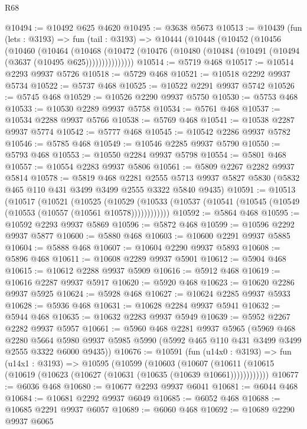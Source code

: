 \begin{lexlean}{R68}
\begin{coremodule}
@10494 := @10492 @625 @4620
@10495 := @3638 @5673
@10513 := @10439
    (fun (lets : @3193) =>
    fun (tail : @3193) =>
    @10444
      (@10448
        (@10452
          (@10456
            (@10460
              (@10464
                (@10468
                  (@10472 (@10476 (@10480 (@10484 (@10491 (@10494 (@3637 (@10495 @625)))))))))))))))
@10514 := @5719 @468
@10517 := @10514 @2293 @9937 @5726
@10518 := @5729 @468
@10521 := @10518 @2292 @9937 @5734
@10522 := @5737 @468
@10525 := @10522 @2291 @9937 @5742
@10526 := @5745 @468
@10529 := @10526 @2290 @9937 @5750
@10530 := @5753 @468
@10533 := @10530 @2289 @9937 @5758
@10534 := @5761 @468
@10537 := @10534 @2288 @9937 @5766
@10538 := @5769 @468
@10541 := @10538 @2287 @9937 @5774
@10542 := @5777 @468
@10545 := @10542 @2286 @9937 @5782
@10546 := @5785 @468
@10549 := @10546 @2285 @9937 @5790
@10550 := @5793 @468
@10553 := @10550 @2284 @9937 @5798
@10554 := @5801 @468
@10557 := @10554 @2283 @9937 @5806
@10561 := @5809 @2267 @2282 @9937 @5814
@10578 := @5819
    @468
    @2281
    @2555
    @5713
    @9937
    @5827
    @5830
    (@5832 @465 @110 @431 @3499 @3499 @2555 @3322 @5840 @9435)
@10591 := @10513
    (@10517
      (@10521
        (@10525
          (@10529 (@10533 (@10537 (@10541 (@10545 (@10549 (@10553 (@10557 (@10561 @10578))))))))))))
@10592 := @5864 @468
@10595 := @10592 @2293 @9937 @5869
@10596 := @5872 @468
@10599 := @10596 @2292 @9937 @5877
@10600 := @5880 @468
@10603 := @10600 @2291 @9937 @5885
@10604 := @5888 @468
@10607 := @10604 @2290 @9937 @5893
@10608 := @5896 @468
@10611 := @10608 @2289 @9937 @5901
@10612 := @5904 @468
@10615 := @10612 @2288 @9937 @5909
@10616 := @5912 @468
@10619 := @10616 @2287 @9937 @5917
@10620 := @5920 @468
@10623 := @10620 @2286 @9937 @5925
@10624 := @5928 @468
@10627 := @10624 @2285 @9937 @5933
@10628 := @5936 @468
@10631 := @10628 @2284 @9937 @5941
@10632 := @5944 @468
@10635 := @10632 @2283 @9937 @5949
@10639 := @5952 @2267 @2282 @9937 @5957
@10661 := @5960
    @468
    @2281
    @9937
    @5965
    (@5969
      @468
      @2280
      @5664
      @5980
      @9937
      @5985
      @5990
      (@5992 @465 @110 @431 @3499 @3499 @2555 @3322 @6000 @9435))
@10676 := @10591
    (fun (u14x0 : @3193) =>
    fun (u14x1 : @3193) =>
    @10595
      (@10599
        (@10603
          (@10607 (@10611 (@10615 (@10619 (@10623 (@10627 (@10631 (@10635 (@10639 @10661))))))))))))
@10677 := @6036 @468
@10680 := @10677 @2293 @9937 @6041
@10681 := @6044 @468
@10684 := @10681 @2292 @9937 @6049
@10685 := @6052 @468
@10688 := @10685 @2291 @9937 @6057
@10689 := @6060 @468
@10692 := @10689 @2290 @9937 @6065

\end{coremodule}
\end{lexlean}
